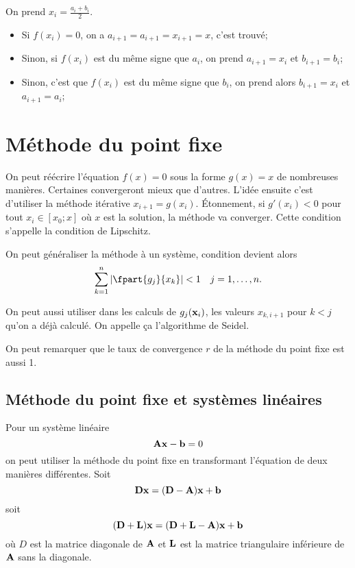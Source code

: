 On prend $x_i = \frac{a_i + b_i}{2}$.
\begin{itemize}
  \item Si $f(x_i) = 0$,
    on a $a_{i+1} = a_{i+1} = x_{i+1} = x$, c'est trouvé;
  \item Sinon, si $f(x_i)$ est du même signe que $a_i$,
    on prend $a_{i+1} = x_i$ et $b_{i+1} = b_i$;
  \item Sinon, c'est que $f(x_i)$ est du même signe que $b_i$,
    on prend alors $b_{i+1} = x_i$ et $a_{i+1} = a_i$;
\end{itemize}



\section{Méthode du point fixe}
On peut réécrire l'équation $f(x) = 0$ sous la forme $g(x) = x$ de nombreuses
manières.
Certaines convergeront mieux que d'autres.
L'idée ensuite c'est d'utiliser la méthode itérative $x_{i+1} = g(x_i)$.
Étonnement, si $g'(x_i) < 0$ pour tout $x_i \in [x_0; x]$
où $x$ est la solution, la méthode va converger.
Cette condition s'appelle la condition de Lipschitz.

On peut généraliser la méthode à un système,
condition devient alors
\begin{align*}
  \sum_{k=1}^n\left|\fpart{g_j}{x_k}\right| & < 1 & j = 1,\ldots,n.
\end{align*}

On peut aussi utiliser dans les calculs de $g_j({\bf x}_i)$,
les valeurs $x_{k,i+1}$ pour $k < j$ qu'on a déjà calculé.
On appelle ça l'algorithme de Seidel.

On peut remarquer que le taux de convergence $r$ de la méthode du
point fixe est aussi 1.

\subsection{Méthode du point fixe et systèmes linéaires}
Pour un système linéaire
\[ {\bf A}{\bf x} - {\bf b} = 0 \]
on peut utiliser la méthode du point fixe en transformant l'équation
de deux manières différentes.
Soit
\[ {\bf D}{\bf x} = ({\bf D} - {\bf A}){\bf x} + {\bf b} \]
soit
\[ ({\bf D} + {\bf L}){\bf x} = ({\bf D} + {\bf L} - {\bf A}){\bf x} + {\bf b} \]
où $D$ est la matrice diagonale de ${\bf A}$ et ${\bf L}$ est
la matrice triangulaire inférieure de ${\bf A}$ sans la diagonale.

